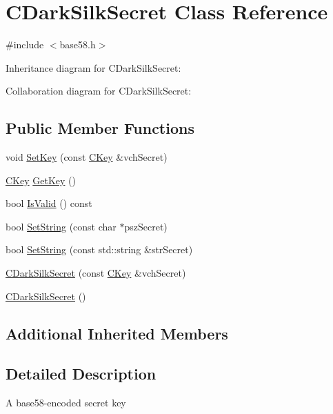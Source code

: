 \hypertarget{class_c_dark_silk_secret}{}\section{C\+Dark\+Silk\+Secret Class Reference}
\label{class_c_dark_silk_secret}


{\ttfamily \#include $<$base58.\+h$>$}



Inheritance diagram for C\+Dark\+Silk\+Secret\+:


Collaboration diagram for C\+Dark\+Silk\+Secret\+:
\subsection*{Public Member Functions}
\begin{DoxyCompactItemize}
\item 
void \hyperlink{class_c_dark_silk_secret_a74deecf3a37ff76ff64ca8b935045bbd}{Set\+Key} (const \hyperlink{class_c_key}{C\+Key} \&vch\+Secret)
\item 
\hyperlink{class_c_key}{C\+Key} \hyperlink{class_c_dark_silk_secret_af7b026d90efb897f6e592ce424c8d2c9}{Get\+Key} ()
\item 
bool \hyperlink{class_c_dark_silk_secret_a30db2efc9987de8a743a2aa000c84617}{Is\+Valid} () const 
\item 
bool \hyperlink{class_c_dark_silk_secret_a06075192fb631c3b406a6ca231d2f926}{Set\+String} (const char $\ast$psz\+Secret)
\item 
bool \hyperlink{class_c_dark_silk_secret_aa6c0a6081ce24721d919c7d606b880e3}{Set\+String} (const std\+::string \&str\+Secret)
\item 
\hyperlink{class_c_dark_silk_secret_af2fbf0da9f230b9c00fbf5d8770af795}{C\+Dark\+Silk\+Secret} (const \hyperlink{class_c_key}{C\+Key} \&vch\+Secret)
\item 
\hyperlink{class_c_dark_silk_secret_abbc53998331cd66391782e00743eb88c}{C\+Dark\+Silk\+Secret} ()
\end{DoxyCompactItemize}
\subsection*{Additional Inherited Members}


\subsection{Detailed Description}
A base58-\/encoded secret key 

